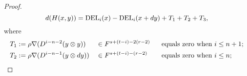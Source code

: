 \documentclass[11pt]{amsart} \renewcommand{\baselinestretch}{1.2}
\theoremstyle{plain}
\numberwithin{equation}{section} %
\theoremstyle{plain}
\numberwithin{equation}{chapter} %
\newcommand{\Nabla}{\nabla}
\begin{document}
\begin{second quadrant homotopy sseq operations}
\begin{proof}
\[d(H(x,y))=\textup{DEL}_i(x)-\textup{DEL}_i(x+dy)+T_1+T_2+T_3,\]
where
%
\begin{alignat*}{3}
T_1:={}&\rho\Nabla(D^{i-n-2}(y\otimes y))&&\in F^{s+(t-i)-2(r-2)}&&\textup{\ \ equals zero when }i\leq n+1;\\
T_2:={}&\rho\Nabla(D^{i-n-1}(y\otimes dy))&&\in F^{s+(t-i)-(r-2)}&&\textup{\ \ equals zero when }i\leq n;\\

\end{alignat*}
\end{proof}
\end{second quadrant homotopy sseq operations}
\end{document}
